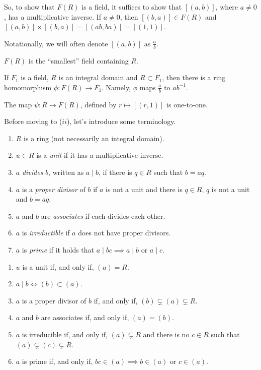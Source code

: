 So, to show that  $F(R)$ is a field, it suffices to show that  $[(a, b)]$, where $a \neq 0$, has a multiplicative inverse. If $a \neq 0$, then $[(b, a)] \in F(R)$ and $[(a, b)] \times [(b, a)] = [(ab, ba)] = [(1, 1)]$.

Notationally, we will often denote $[(a, b)]$ as $\frac{a}{b}$.

 \begin{prop}
	 $F(R)$ is the ``smallest'' field containing $R$.
\end{prop}

\begin{thm}
	If $F_1$ is a field, $R$ is an integral domain and $R \subset F_1$, then there is a ring homomorphism $\phi: F(R) \to F_1$. Namely, $\phi$ maps $\frac{a}{b}$ to $ab^{-1}$.
\end{thm}

\begin{prop}
	The map $\psi: R \to F(R)$, defined by $r \mapsto [(r, 1)]$ is one-to-one.
\end{prop}

Before moving to ($ii$), let's introduce some terminology.
\begin{enumerate}[label = \textbullet]
	\item $R$ is a ring (not necessarily an integral domain).
	\item $u \in R$ is a \emph{unit} if it has a multiplicative inverse.
	\item $a$ \emph{divides} $b$, written as $a \mid b$, if there is $q \in R$ such that $b = aq$. 
	\item $a$ is a \emph{proper divisor} of  $b$ if $a$ is not a unit and there is $q \in R$, $q$ is not a unit and $b = aq$.
	\item  $a$ and $b$ are \emph{associates} if each divides each other.
	\item $a$ is \emph{irreductible} if $a$ does not have proper divisors.
	\item $a$ is \emph{prime} if it holds that $a \mid bc \implies a \mid b$ or  $a \mid c$.
\end{enumerate}

\begin{lem}
	\begin{enumerate}[label = \textbullet, before = \leavevmode\vspace{-\baselineskip}]
		\item $u$ is a unit if, and only if, $(u) = R$.
		\item $a \mid b \iff (b) \subset (a)$.
		\item $a$ is a proper divisor of $b$ if, and only if, $(b) \subsetneq (a) \subsetneq R$.
		\item $a$ and $b$ are associates if, and only if, $(a) = (b)$.
		\item $a$ is irreducible if, and only if, $(a) \subsetneq R$ and there is no $c \in R$ such that $(a) \subsetneq (c) \subsetneq R$.
		\item $a$ is prime if, and only if, $bc \in (a) \implies b \in (a)$ or $c \in (a)$.
	\end{enumerate}
\end
{lem}

